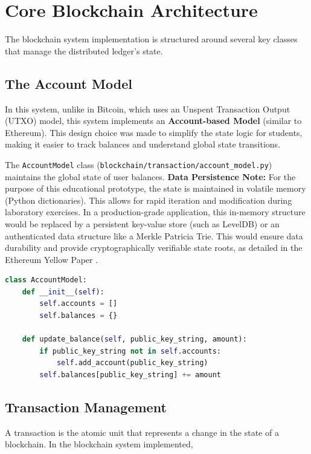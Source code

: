 \section{Core Blockchain Architecture} \label{ch4_core_architecture}

The blockchain system implementation is structured around several key classes that manage the distributed ledger's state.

\subsection{The Account Model} \label{ch4_account_model}
In this system, unlike in Bitcoin, which uses an Unspent Transaction Output (UTXO) model, this system implements an \textbf{Account-based Model} (similar to Ethereum). This design choice was made to simplify the state logic for students, making it easier to track balances and understand global state transitions.

The \texttt{AccountModel} class (\texttt{blockchain/transaction/account\_model.py}) maintains the global state of user balances. \textbf{Data Persistence Note:}
For the purpose of this educational prototype, the state is maintained in volatile memory (Python dictionaries). This allows for rapid iteration and modification during laboratory exercises. In a production-grade application, this in-memory structure would be replaced by a persistent key-value store (such as LevelDB) or an authenticated data structure like a Merkle Patricia Trie. This would ensure data durability and provide cryptographically verifiable state roots, as detailed in the Ethereum Yellow Paper \cite{wood2014ethereum}.

\newpage
\begin{lstlisting}[language=Python, caption=Account Model Implementation, label=lst:account_model]
class AccountModel:
    def __init__(self):
        self.accounts = []
        self.balances = {}

    def update_balance(self, public_key_string, amount):
        if public_key_string not in self.accounts:
            self.add_account(public_key_string)
        self.balances[public_key_string] += amount
\end{lstlisting}

\subsection{Transaction Management} \label{ch4_transaction_impl}
A transaction is the atomic unit that represents a change in the state of a blockchain. In the blockchain system implemented,

